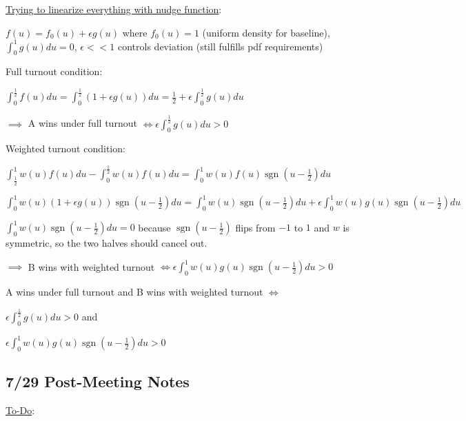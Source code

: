 \documentclass[12pt]{article}
\begin{document}
\underline{Trying to linearize everything with nudge function}:

$f(u) = f_0(u) + \epsilon g(u)$ where $f_0(u) = 1$ (uniform density for baseline), $\int_0^1 g(u) du = 0$, $\epsilon < < 1$ controls deviation (still fulfills pdf requirements)

Full turnout condition:

$\int_0^\frac{1}{2} f(u)du = \int_0^\frac{1}{2} (1 + \epsilon g(u)) du = \frac{1}{2} + \epsilon \int_0^\frac{1}{2}g(u)du$

$\implies$ A wins under full turnout $\iff \epsilon \int_0^\frac{1}{2}g(u)du > 0$

Weighted turnout condition:

$\int_\frac{1}{2}^1w(u)f(u)du - \int_0^\frac{1}{2}w(u)f(u)du = \int_0^1w(u)f(u)\operatorname{sgn}(u - \frac{1}{2})du$

$\int_0^1w(u)(1 + \epsilon g(u))\operatorname{sgn}(u - \frac{1}{2})du = \int_0^1w(u)\operatorname{sgn}(u - \frac{1}{2})du + \epsilon \int_0^1w(u)g(u)\operatorname{sgn}(u - \frac{1}{2})du$

$\int_0^1w(u)\operatorname{sgn}(u - \frac{1}{2})du = 0$ because $\operatorname{sgn}(u - \frac{1}{2})$ flips from $-1$ to $1$ and $w$ is symmetric, so the two halves should cancel out.

$\implies$ B wins with weighted turnout $\iff \epsilon\int_0^1w(u)g(u)\operatorname{sgn}(u - \frac{1}{2})du > 0$

A wins under full turnout and B wins with weighted turnout $\iff$
\begin{description}[nolistsep]
    \item[\normalfont Constraint 1:] $\epsilon \int_0^\frac{1}{2}g(u)du > 0$ and
    \item[\normalfont Constraint 2:] $\epsilon\int_0^1w(u)g(u)\operatorname{sgn}(u - \frac{1}{2})du > 0$
\end{description}


\subsection*{7/29 Post-Meeting Notes}

\underline{To-Do}:
\end{document}
